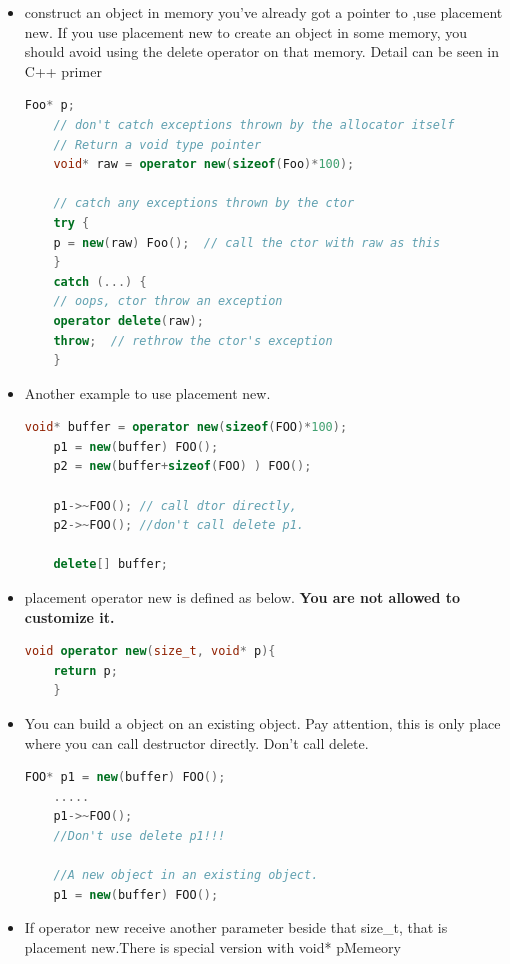 \documentclass[a4paper,11pt,twoside]{book}
\begin{document}
\begin{itemize}
	\item construct an object in memory you've already got a pointer to ,use placement new. If you use placement new to create an object in some memory, you should avoid using the delete operator on that memory.  Detail can be seen in C++ primer
	\begin{lstlisting}[frame=single, language=c++]
	Foo* p;
	// don't catch exceptions thrown by the allocator itself
	// Return a void type pointer
	void* raw = operator new(sizeof(Foo)*100);
	
	// catch any exceptions thrown by the ctor
	try {
	p = new(raw) Foo();  // call the ctor with raw as this
	}
	catch (...) {
	// oops, ctor throw an exception
	operator delete(raw);
	throw;  // rethrow the ctor's exception
	}
	\end{lstlisting}
	
	\item Another example to use placement new.
	\begin{lstlisting}[frame=single, language=c++]
	void* buffer = operator new(sizeof(FOO)*100);
	p1 = new(buffer) FOO();
	p2 = new(buffer+sizeof(FOO) ) FOO();
	
	p1->~FOO(); // call dtor directly,
	p2->~FOO(); //don't call delete p1.
	
	delete[] buffer;
	\end{lstlisting}
	
	\item placement operator new is defined as below. \textbf{You are not allowed to customize it.}
	\begin{lstlisting}[frame=single, language=c++]
	void operator new(size_t, void* p){
	return p;
	}
	\end{lstlisting}
	
	\item You can build a object on an existing object. Pay attention, this is only place where you can call destructor directly. Don't call delete. 
	\begin{lstlisting}[frame=single, language=c++]
	FOO* p1 = new(buffer) FOO();
	.....
	p1->~FOO();
	//Don't use delete p1!!!
	
	//A new object in an existing object.
	p1 = new(buffer) FOO(); 
	\end{lstlisting}
	
	\item If operator new receive another parameter beside that size\_t, that is placement new.There is special version with void* pMemeory
	

\end{itemize}
\end{document}
